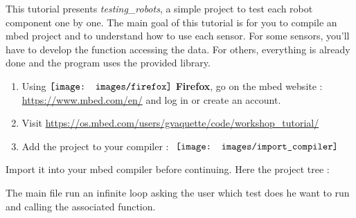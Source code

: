 This tutorial presents \textit{testing\_robots}, a simple project to test each robot component one by one. The main goal of this tutorial is for you to compile an mbed project and to understand how to use each sensor.
For some sensors, you'll have to develop the function accessing the data. For others, everything is already done and the program uses the provided library.



\begin{UPSTIactivite}

 \begin{enumerate}
  \item Using $\vcenter{\hbox{\texttt{[image: images/firefox]}}}$ \textbf{Firefox}, go on the mbed website : \url{https://www.mbed.com/en/} and log in or create an account.
  \item Visit \url{https://os.mbed.com/users/gvaquette/code/workshop_tutorial/}
  \item Add the project to your compiler : $\vcenter{\hbox{ \texttt{[image: images/import\_compiler]}}}$
 \end{enumerate}


\end{UPSTIactivite}

Import it into your mbed compiler before continuing.
Here the project tree :


The main file run an infinite loop asking the user which test does he want to run and calling the associated function.
